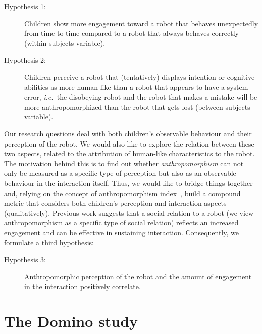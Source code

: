\documentclass{sig-alternate}
\newcommand{\ie}{{\textit{i.e.~}}}
\begin{document}
\begin{description}

    \item[Hypothesis 1:] Children show more engagement toward a robot that
        behaves unexpectedly from time to time compared to a robot that always
        behaves correctly (within subjects variable).

    \item[Hypothesis 2:] Children perceive a robot that (tentatively) displays
        intention or cognitive abilities as more human-like than a robot that
        appears to have a system error, \ie the disobeying robot and the robot
        that makes a mistake will be more anthropomorphized than the robot that
        gets lost (between subjects variable).

\end{description}

Our research questions deal with both children's observable behaviour and their
perception of the robot. We would also like to explore the relation between
these two aspects, related to the attribution of human-like characteristics to
the robot. The motivation behind this is to find out whether
\textit{anthropomorphism} can not only be measured as a specific type of
perception but also as an observable behaviour in the interaction itself. Thus,
we would like to bridge things together and, relying on the concept of
anthropomorphism index~\cite{fink2014dynamics}, build a compound metric that
considers both children's perception and interaction aspects (qualitatively).
Previous work suggests that a social relation to a robot (we view
anthropomorphism as a specific type of social relation) reflects an increased
engagement and can be effective in sustaining interaction.  Consequently, we
formulate a third hypothesis:

\begin{description}

    \item[Hypothesis 3:] Anthropomorphic perception of the robot and the amount
    of engagement in the interaction positively correlate.

\end{description}



\section{The Domino study}
\end{document}
